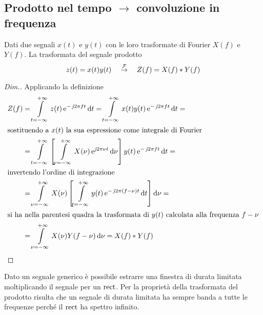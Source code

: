 \subsection{Prodotto nel tempo \texorpdfstring{$\to$}{come} convoluzione in frequenza}
Dati due segnali $x(t)$ e $y(t)$ con le loro trasformate di Fourier $X(f)$ e $Y(f)$. La trasformata del segnale prodotto
\begin{equation}
z(t) = x(t) y(t) \quad\overset{\operatorname{\mathcal{F}}}{\rightarrow}\quad Z(f) = X(f)\ast Y(f)
\end{equation}

\begin{proof}[Dim.] Applicando la definizione
\begin{align*}
Z(f)&=\intd{t=-\infty}{+\infty}{z(t)\e{-\imath 2\pi f t}}{t}=\intd{t=-\infty}{+\infty}{x(t)y(t)\e{-\imath 2\pi f t}}{t}=\\
\intertext{sostituendo a $x(t)$ la sua espressione come integrale di Fourier}
&=\intd{t=-\infty}{+\infty}{\left[\intd{\nu=-\infty}{+\infty}{X(\nu)\e{\imath 2\pi\nu t}}{\nu}\right]y(t)\e{-\imath 2\pi f t}}{t}=\\
\intertext{invertendo l'ordine di integrazione}
&=\intd{\nu=-\infty}{+\infty}{X(\nu)\left[\intd{t=-\infty}{+\infty}{y(t)\e{-\imath 2\pi(f-\nu)t}}{t}\right]}{\nu}=\\
\intertext{si ha nella parentesi quadra la trasformata di $y(t)$ calcolata alla frequenza $f-\nu$}
&=\intd{\nu=-\infty}{+\infty}{X(\nu)Y(f-\nu)}{\nu} = X(f)\ast Y(f)
\qedhere
\end{align*}
\end{proof}

\begin{nota}
Dato un segnale generico è possibile estrarre una finestra di durata limitata moltiplicando il segnale per un $\operatorname{rect}$. Per la proprietà della trasformata del prodotto risulta che un segnale di durata limitata ha sempre banda a tutte le frequenze perché il $\operatorname{rect}$ ha spettro infinito.
\end{nota}

